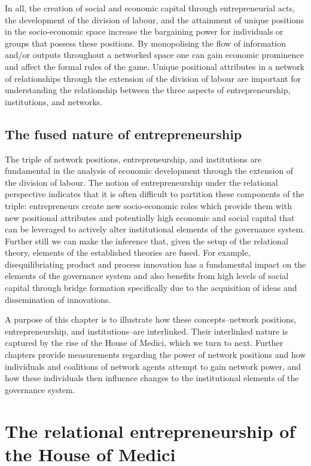 In all, the creation of social and economic capital through entrepreneurial acts, the development of the division of labour, and the attainment of unique positions in the socio-economic space increase the bargaining power for individuals or groups that possess these positions. By monopolising the flow of information and/or outputs throughout a networked space one can gain economic prominence and affect the formal rules of the game. Unique positional attributes in a network of relationships through the extension of the division of labour are important for understanding the relationship between the three aspects of entrepreneurship, institutions, and networks.

\subsection{The fused nature of entrepreneurship}

The triple of network positions, entrepreneurship, and institutions are fundamental in the analysis of economic development through the extension of the division of labour. The notion of entrepreneurship under the relational perspective indicates that it is often difficult to partition these components of the triple: entrepreneurs create new socio-economic roles which provide them with new positional attributes and potentially high economic and social capital that can be leveraged to actively alter institutional elements of the governance system. Further still we can make the inference that, given the setup of the relational theory, elements of the established theories are fused. For example, disequilibriating product and process innovation has a fundamental impact on the elements of the governance system and also benefits from high levels of social capital through bridge formation specifically due to the acquisition of ideas and dissemination of innovations.

A purpose of this chapter is to illustrate how these concepts--network positions, entrepreneurship, and institutions--are interlinked. Their interlinked nature is captured by the rise of the House of Medici, which we turn to next. Further chapters provide measurements regarding the power of network positions and how individuals and coalitions of network agents attempt to gain network power, and how these individuals then influence changes to the institutional elements of the governance system.

\section{The relational entrepreneurship of the House of Medici} 
\label{sec:HouseofMedici}

